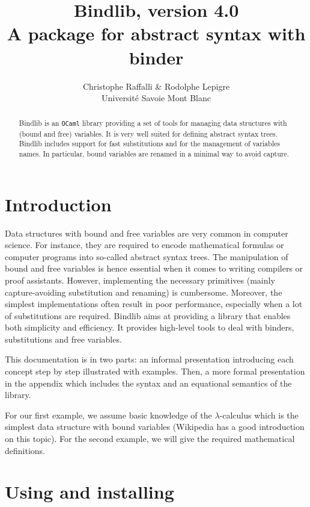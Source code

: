 \documentclass[11pt]{article}
\title{
  Bindlib, version 4.0 \\
  A package for abstract syntax with binder
}
\author{
  Christophe Raffalli \& Rodolphe Lepigre \\
  Université Savoie Mont Blanc
}
\begin{document}
\maketitle

\vspace{1cm}
\begin{abstract}
  Bindlib is an \verb#OCaml# library providing a set of tools for managing
  data structures with (bound and free) variables. It is very well suited for
  defining abstract syntax trees.
  Bindlib includes support for fast substitutions and for the management of
  variables names. In particular, bound variables are renamed in a minimal
  way to avoid capture.
\end{abstract}
\vspace{1cm}

\tableofcontents

\section{Introduction}

Data structures with bound and free variables are very common in computer
science. For instance, they are required to encode mathematical formulas or
computer programs into so-called abstract syntax trees. The manipulation of
bound and free variables is hence essential when it comes to writing
compilers or proof assistants. However, implementing the necessary primitives
(mainly capture-avoiding substitution and renaming) is cumbersome. Moreover,
the simplest implementations often result in poor performance, especially
when a lot of substitutions are required. Bindlib aims at providing a library
that enables both simplicity and efficiency. It provides high-level tools to
deal with binders, substitutions and free variables.

This documentation is in two parts: an informal presentation
introducing each concept step by step illustrated with examples. Then,
a more formal presentation in the appendix which includes the syntax
and an equational semantics of the library.

For our first example, we assume basic knowledge of the $\lambda$-calculus
which is the simplest data structure with bound variables (Wikipedia
has a good introduction on this topic). For the second example, we
will give the required mathematical definitions.

\section{Using and installing}
\end{document}
